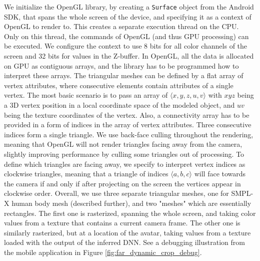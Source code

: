 We initialize the OpenGL library, by creating a \verb|Surface| object from the Android SDK, that spans the whole screen of the device, and specifying it as a context of OpenGL to render to. This creates a separate execution thread on the CPU. Only on this thread, the commands of OpenGL (and thus GPU processing) can be executed. We configure the context to use 8 bits for all color channels of the screen and 32 bits for values in the Z-buffer. In OpenGL, all the data is allocated on GPU as contiguous arrays, and the library has to be programmed how to interpret these arrays. The triangular meshes can be defined by a flat array of vertex attributes, where consecutive elements contain attributes of a single vertex. The most basic scenario is to pass an array of $\langle x, y, z, u, v\rangle$ with $xyz$ being a 3D vertex position in a local coordinate space of the modeled object, and $uv$ being the texture coordinates of the vertex. Also, a connectivity array has to be provided in a form of indices in the array of vertex attributes. Three consecutive indices form a single triangle. We use back-face culling throughout the rendering, meaning that OpenGL will not render triangles facing away from the camera, slightly improving performance by culling some triangles out of processing. To define which triangles are facing away, we specify to interpret vertex indices as clockwise triangles, meaning that a triangle of indices $\langle a, b, c\rangle$ will face towards the camera if and only if after projecting on the screen the vertices appear in clockwise order. Overall, we use three separate triangular meshes, one for SMPL-X human body mesh (described further), and two "meshes" which are essentially rectangles. The first one is rasterized, spanning the whole screen, and taking color values from a texture that contains a current camera frame. The other one is similarly rasterized, but at a location of the avatar, taking values from a texture loaded with the output of the inferred DNN. See a debugging illustration from the mobile application in Figure \ref{fig:far_dynamic_crop_debug}.


